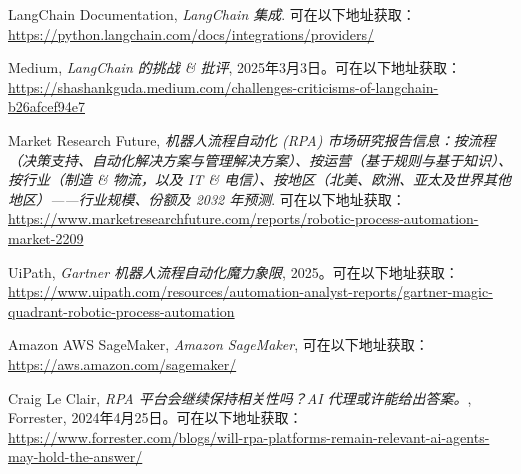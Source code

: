 \documentclass[11pt, a4paper, oneside]{article}
\begin{document}
\begin{thebibliography}{99}
    LangChain Documentation, \textit{LangChain 集成}. 可在以下地址获取：\url{https://python.langchain.com/docs/integrations/providers/}

    Medium, \textit{LangChain 的挑战 \& 批评}, 2025年3月3日。可在以下地址获取：\url{https://shashankguda.medium.com/challenges-criticisms-of-langchain-b26afcef94e7}

    Market Research Future, \textit{机器人流程自动化 (RPA) 市场研究报告信息：按流程（决策支持、自动化解决方案与管理解决方案）、按运营（基于规则与基于知识）、按行业（制造 \& 物流，以及 IT \& 电信）、按地区（北美、欧洲、亚太及世界其他地区）——行业规模、份额及 2032 年预测}. 可在以下地址获取：\url{https://www.marketresearchfuture.com/reports/robotic-process-automation-market-2209}

    UiPath, \textit{Gartner 机器人流程自动化魔力象限}, 2025。可在以下地址获取：
    \url{https://www.uipath.com/resources/automation-analyst-reports/gartner-magic-quadrant-robotic-process-automation}

    Amazon AWS SageMaker, \textit{Amazon SageMaker}, 可在以下地址获取：\url{https://aws.amazon.com/sagemaker/}

    Craig Le Clair, \textit{RPA 平台会继续保持相关性吗？AI 代理或许能给出答案。}, Forrester, 2024年4月25日。可在以下地址获取：\url{https://www.forrester.com/blogs/will-rpa-platforms-remain-relevant-ai-agents-may-hold-the-answer/}



\end{thebibliography}
\end{document}
